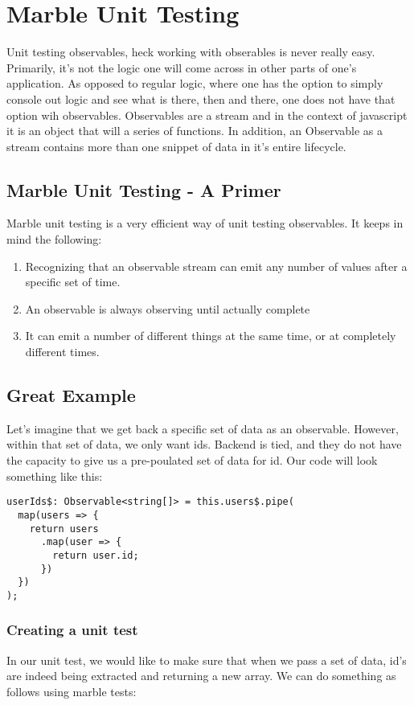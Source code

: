 
\section{ Marble Unit Testing }

Unit testing observables, heck working with obserables is never really easy.
Primarily, it's not the logic one will come across in other parts of one's
application. As opposed to regular logic, where one has the option to simply
console out logic and see what is there, then and there, one does not have that
option wih observables. Observables are a stream and in the context of
javascript it is an object that will a series of functions. In addition, an
Observable as a stream contains more than one snippet of data in it's entire
lifecycle.

\subsection{ Marble Unit Testing - A Primer }
Marble unit testing is a very efficient way of unit testing observables. It
keeps in mind the following:
\begin{enumerate}
  \item Recognizing that an observable stream can emit any number of values
  after a specific set of time.
  \item An observable is always observing until actually complete
  \item It can emit a number of different things at the same time, or at
  completely different times.
\end{enumerate}

\subsection{ Great Example }
Let's imagine that we get back a specific set of data as an observable. However,
within that set of data, we only want ids. Backend is tied, and they do not have
the capacity to give us a pre-poulated set of data for id. Our code will look
something like this:
\begin{lstlisting}
userIds$: Observable<string[]> = this.users$.pipe(
  map(users => {
    return users
      .map(user => {
        return user.id;
      })
  })
);
\end{lstlisting}

\subsubsection{Creating a unit test}
In our unit test, we would like to make sure that when we pass a set of data,
id's are indeed being extracted and returning a new array. We can do something
as follows using marble tests:

